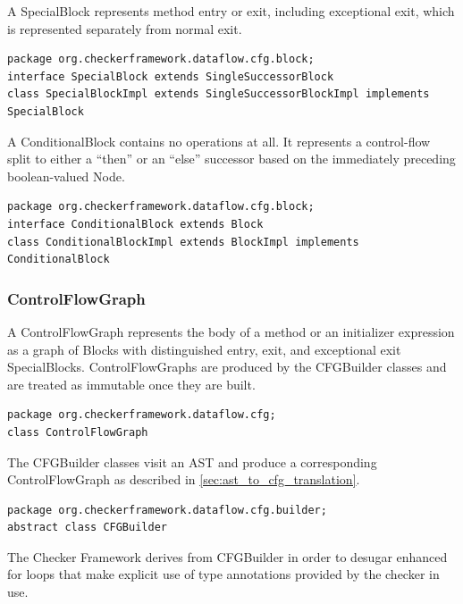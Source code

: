 A SpecialBlock represents method entry or exit, including exceptional
exit, which is represented separately from normal exit.

\begin{verbatim}
package org.checkerframework.dataflow.cfg.block;
interface SpecialBlock extends SingleSuccessorBlock
class SpecialBlockImpl extends SingleSuccessorBlockImpl implements SpecialBlock
\end{verbatim}

A ConditionalBlock contains no operations at all.  It represents a
control-flow split to either a ``then'' or an ``else'' successor based on
the immediately preceding boolean-valued Node.

\begin{verbatim}
package org.checkerframework.dataflow.cfg.block;
interface ConditionalBlock extends Block
class ConditionalBlockImpl extends BlockImpl implements ConditionalBlock
\end{verbatim}



\subsubsection{ControlFlowGraph}
\label{sec:control_flow_graph_class}

A ControlFlowGraph represents the body of a method or an initializer
expression as a graph of Blocks with distinguished entry, exit, and
exceptional exit SpecialBlocks.  ControlFlowGraphs are produced by the
CFGBuilder classes and are treated as immutable once they are built.

\begin{verbatim}
package org.checkerframework.dataflow.cfg;
class ControlFlowGraph
\end{verbatim}

\label{sec:cfg_builder_classes}

The CFGBuilder classes visit an AST and produce a corresponding
ControlFlowGraph as described in \autoref{sec:ast_to_cfg_translation}.

\begin{verbatim}
package org.checkerframework.dataflow.cfg.builder;
abstract class CFGBuilder
\end{verbatim}

The Checker Framework derives from CFGBuilder in order to desugar
enhanced for loops that make explicit use of type annotations provided
by the checker in use.

